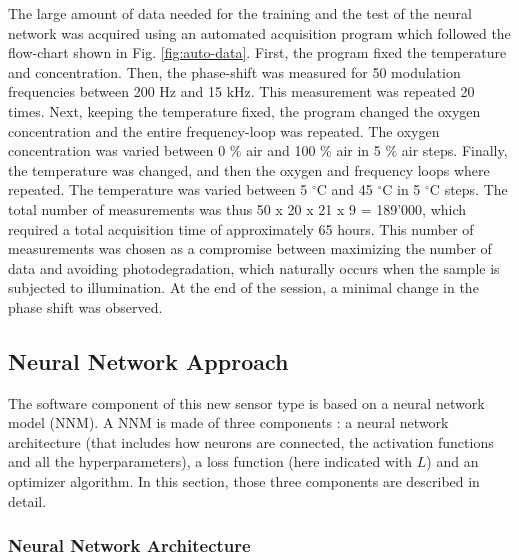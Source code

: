 \documentclass[9pt,twocolumn,twoside,pdftex]{optica}
\begin{document}
The large amount of data needed for the training and the test of the neural network was acquired using an automated acquisition program which followed the flow-chart shown in Fig. \ref{fig:auto-data}. First, the program fixed the temperature and concentration. Then, the phase-shift was measured for 50 modulation frequencies between 200 Hz and 15 kHz. This measurement was repeated 20 times. Next, keeping the temperature fixed, the program changed the oxygen concentration and the entire frequency-loop was repeated.
The oxygen concentration was varied between 0 $\%$ air and 100 $\%$ air in 5 $\%$ air steps.
Finally, the temperature was changed, and then the oxygen and frequency loops where repeated. The temperature was varied between 5 $^\circ$C and 45 $^\circ$C in 5 $^\circ$C steps.
The total number of measurements was thus 50 x 20 x 21 x 9 = 189'000, which required a total acquisition time of approximately 65 hours. This number of measurements was chosen as a compromise between maximizing the number of data and avoiding photodegradation, which naturally occurs when the sample is subjected to illumination. At the end of the session, a minimal change in the phase shift was observed.



\subsection{Neural Network Approach}
\label{NN}

The software component of this new sensor type is based on a neural network model (NNM). A NNM is made of three components \cite{Michelucci2017}: a neural network architecture (that includes how neurons are connected, the activation functions and all the hyperparameters), a loss function (here indicated with $L$) and an optimizer algorithm. In this section, those three components are described in detail.

\subsubsection{Neural Network Architecture}
\end{document}
